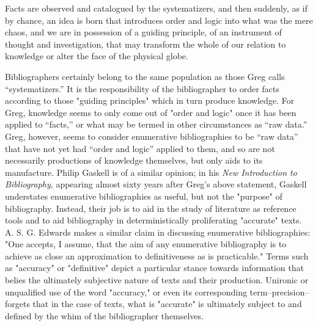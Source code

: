 \begin{displayquote}
Facts are observed and catalogued by the systematizers, and then suddenly, as if by chance, an idea is born that introduces order and logic into what was the mere chaos, and we are in possession of a guiding principle, of an instrument of thought and investigation, that may transform the whole of our relation to knowledge or alter the face of the physical globe.\autocite[41]{greg_what_1913}
\end{displayquote} 
Bibliographers certainly belong to the same population as those Greg calls ``systematizers.'' It is the responsibility of the bibliographer to order facts according to those "guiding principles" which in turn produce knowledge. For Greg, knowledge seems to only come out of "order and logic" once it has been applied to ``facts,'' or what may be termed in other circumstances as ``raw data.'' Greg, however, seems to consider enumerative bibliographies to be ``raw data'' that have not yet had ``order and logic'' applied to them, and so  are not necessarily productions of knowledge themselves, but only aids to its manufacture. Philip Gaskell is of a similar opinion; in his \textit{New Introduction to Bibliography}, appearing almost sixty years after Greg's above statement, Gaskell understates enumerative bibliographies as useful, but not the "purpose" of bibliography. Instead, their job is to aid in the study of literature as reference tools and to aid bibliography in deterministically proliferating "accurate" texts. \autocite{gaskell_new_1972} A. S. G. Edwards makes a similar claim in discussing enumerative bibliographies: "One accepts, I assume, that the aim of any enumerative bibliography is to achieve as close an approximation to definitiveness as is practicable." \autocite[331]{edwards_problems_1981-1} Terms such as "accuracy" or "definitive" depict a particular stance towards information that belies the ultimately subjective nature of texts and their production. Unironic or unqualified use of the word "accuracy," or even its corresponding term--precision--forgets that in the case of texts, what is "accurate" is ultimately subject to and defined by the whim of the bibliographer themselves.

